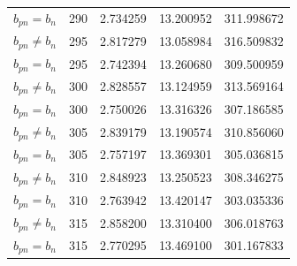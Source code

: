 \begin{longtable}{l r r r r}
$b_{pn} = b_n$ & 290 & 2.734259 & 13.200952 & 311.998672 \\
$b_{pn} \neq b_n$ & 295 & 2.817279 & 13.058984 & 316.509832 \\
$b_{pn} = b_n$ & 295 & 2.742394 & 13.260680 & 309.500959 \\
$b_{pn} \neq b_n$ & 300 & 2.828557 & 13.124959 & 313.569164 \\
$b_{pn} = b_n$ & 300 & 2.750026 & 13.316326 & 307.186585 \\
$b_{pn} \neq b_n$ & 305 & 2.839179 & 13.190574 & 310.856060 \\
$b_{pn} = b_n$ & 305 & 2.757197 & 13.369301 & 305.036815 \\
$b_{pn} \neq b_n$ & 310 & 2.848923 & 13.250523 & 308.346275 \\
$b_{pn} = b_n$ & 310 & 2.763942 & 13.420147 & 303.035336 \\
$b_{pn} \neq b_n$ & 315 & 2.858200 & 13.310400 & 306.018763 \\
$b_{pn} = b_n$ & 315 & 2.770295 & 13.469100 & 301.167833 \\
        \end{longtable}
